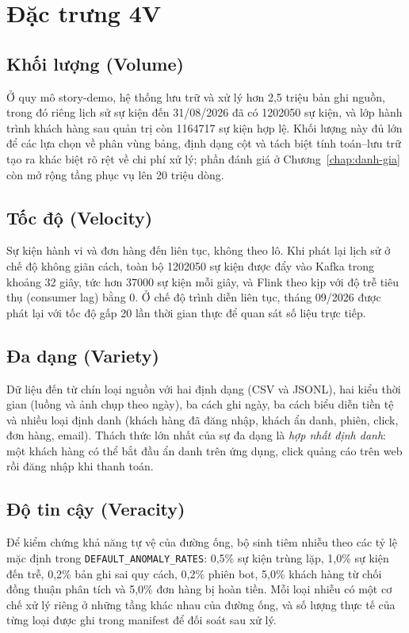 \section{Đặc trưng 4V}
\label{sec:c2-4v}

\subsection{Khối lượng (Volume)}
\label{sec:c2-volume}
Ở quy mô story-demo, hệ thống lưu trữ và xử lý hơn 2,5 triệu bản ghi nguồn, trong đó riêng lịch sử sự kiện đến 31/08/2026 đã có \num{1202050} sự kiện, và lớp hành trình khách hàng sau quản trị còn \num{1164717} sự kiện hợp lệ. Khối lượng này đủ lớn để các lựa chọn về phân vùng bảng, định dạng cột và tách biệt tính toán--lưu trữ tạo ra khác biệt rõ rệt về chi phí xử lý; phần đánh giá ở Chương~\ref{chap:danh-gia} còn mở rộng tầng phục vụ lên 20 triệu dòng.

\subsection{Tốc độ (Velocity)}
\label{sec:c2-velocity}
Sự kiện hành vi và đơn hàng đến liên tục, không theo lô. Khi phát lại lịch sử ở chế độ không giãn cách, toàn bộ \num{1202050} sự kiện được đẩy vào Kafka trong khoảng 32 giây, tức hơn \num{37000} sự kiện mỗi giây, và Flink theo kịp với độ trễ tiêu thụ (consumer lag) bằng 0. Ở chế độ trình diễn liên tục, tháng 09/2026 được phát lại với tốc độ gấp 20 lần thời gian thực để quan sát số liệu trực tiếp.

\subsection{Đa dạng (Variety)}
\label{sec:c2-variety}
Dữ liệu đến từ chín loại nguồn với hai định dạng (CSV và JSONL), hai kiểu thời gian (luồng và ảnh chụp theo ngày), ba cách ghi ngày, ba cách biểu diễn tiền tệ và nhiều loại định danh (khách hàng đã đăng nhập, khách ẩn danh, phiên, click, đơn hàng, email). Thách thức lớn nhất của sự đa dạng là \emph{hợp nhất định danh}: một khách hàng có thể bắt đầu ẩn danh trên ứng dụng, click quảng cáo trên web rồi đăng nhập khi thanh toán.

\subsection{Độ tin cậy (Veracity)}
\label{sec:c2-veracity}
Để kiểm chứng khả năng tự vệ của đường ống, bộ sinh tiêm nhiễu theo các tỷ lệ mặc định trong \texttt{DEFAULT\_ANOMALY\_RATES}: 0,5\% sự kiện trùng lặp, 1,0\% sự kiện đến trễ, 0,2\% bản ghi sai quy cách, 0,2\% phiên bot, 5,0\% khách hàng từ chối đồng thuận phân tích và 5,0\% đơn hàng bị hoàn tiền. Mỗi loại nhiễu có một cơ chế xử lý riêng ở những tầng khác nhau của đường ống, và số lượng thực tế của từng loại được ghi trong manifest để đối soát sau xử lý.

